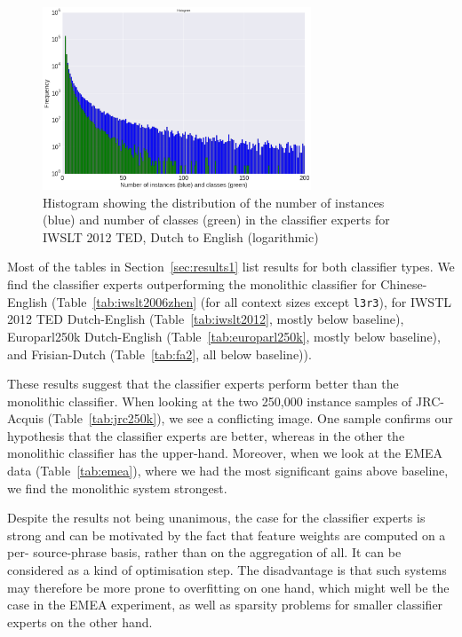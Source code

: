 \documentclass[smallextended]{svjour3}       %
\theoremstyle{break}
\begin{document}
\begin{figure}
\includegraphics[width=80.00mm]{classifierhistogram.png}
\caption{Histogram showing the distribution of the number of instances (blue) and number of classes (green) in the classifier experts for IWSLT 2012 TED, Dutch to English (logarithmic)}
\label{fig:histogram}
\end{figure}

Most of the tables in Section~\ref{sec:results1} list results for both classifier
types.  We find the classifier experts outperforming the monolithic classifier
for Chinese-English (Table~\ref{tab:iwslt2006zhen} (for all context sizes except
\texttt{l3r3}), for  IWSTL 2012 TED Dutch-English (Table~\ref{tab:iwslt2012},
mostly below baseline), Europarl250k Dutch-English
(Table~\ref{tab:europarl250k}, mostly below baseline), and Frisian-Dutch
(Table~\ref{tab:fa2}, all below baseline)).

These results suggest that the classifier experts perform better than the
monolithic classifier. When looking at the two 250,000 instance samples of
JRC-Acquis (Table~\ref{tab:jrc250k}), we see a conflicting image. One sample
confirms our hypothesis that the classifier experts are better, whereas in the
other the monolithic classifier has the upper-hand. Moreover, when we look at
the EMEA data (Table~\ref{tab:emea}), where we had the most significant gains
above baseline, we find the monolithic system strongest. 

Despite the results not being unanimous, the case for the classifier experts is
strong and can be motivated by the fact that feature weights are computed on a per-
source-phrase basis, rather than on the aggregation of all. It can be considered as a
kind of optimisation step. The disadvantage is that such systems may therefore
be more prone to overfitting on one hand, which might well be the case in the
EMEA experiment, as well as sparsity problems for smaller classifier experts on
the other hand.

\end{document}
